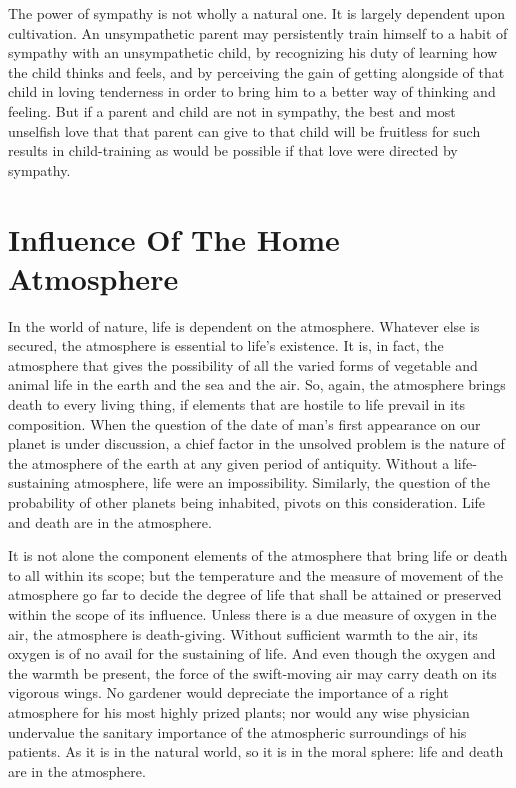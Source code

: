 \documentclass[
]{book}
\begin{document}
The power of sympathy is not wholly a natural one. It is largely dependent upon cultivation. An unsympathetic parent may persistently train himself to a habit of sympathy with an unsympathetic child, by recognizing his duty of learning how the child thinks and feels, and by perceiving the gain of getting alongside of that child in loving tenderness in order to bring him to a better way of thinking and feeling. But if a parent and child are not in sympathy, the best and most unselfish love that that parent can give to that child will be fruitless for such results in child-training as would be possible if that love were directed by sympathy.

\hypertarget{influence-of-the-home-atmosphere}{%
\chapter{Influence Of The Home Atmosphere}\label{influence-of-the-home-atmosphere}}

In the world of nature, life is dependent on the atmosphere. Whatever else is secured, the atmosphere is essential to life's existence. It is, in fact, the atmosphere that gives the possibility of all the varied forms of vegetable and animal life in the earth and the sea and the air. So, again, the atmosphere brings death to every living thing, if elements that are hostile to life prevail in its composition. When the question of the date of man's first appearance on our planet is under discussion, a chief factor in the unsolved problem is the nature of the atmosphere of the earth at any given period of antiquity. Without a life-sustaining atmosphere, life were an impossibility. Similarly, the question of the probability of other planets being inhabited, pivots on this consideration. Life and death are in the atmosphere.

It is not alone the component elements of the atmosphere that bring life or death to all within its scope; but the temperature and the measure of movement of the atmosphere go far to decide the degree of life that shall be attained or preserved within the scope of its influence. Unless there is a due measure of oxygen in the air, the atmosphere is death-giving. Without sufficient warmth to the air, its oxygen is of no avail for the sustaining of life. And even though the oxygen and the warmth be present, the force of the swift-moving air may carry death on its vigorous wings. No gardener would depreciate the importance of a right atmosphere for his most highly prized plants; nor would any wise physician undervalue the sanitary importance of the atmospheric surroundings of his patients. As it is in the natural world, so it is in the moral sphere: life and death are in the atmosphere.
\end{document}

